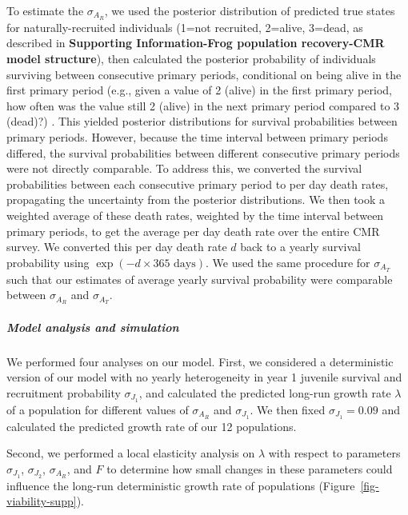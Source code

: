\documentclass[9pt,twoside,lineno]{pnas-new}
\begin{document}
To estimate the \(\sigma_{A_R}\), we used the posterior distribution of
predicted true states for naturally-recruited individuals (1=not
recruited, 2=alive, 3=dead, as described in \textbf{Supporting
Information-Frog population recovery-CMR model structure}), then
calculated the posterior probability of individuals surviving between
consecutive primary periods, conditional on being alive in the first
primary period (e.g., given a value of 2 (alive) in the first primary
period, how often was the value still 2 (alive) in the next primary
period compared to 3 (dead)?) . This yielded posterior distributions for
survival probabilities between primary periods. However, because the
time interval between primary periods differed, the survival
probabilities between different consecutive primary periods were not
directly comparable. To address this, we converted the survival
probabilities between each consecutive primary period to per day death
rates, propagating the uncertainty from the posterior distributions. We
then took a weighted average of these death rates, weighted by the time
interval between primary periods, to get the average per day death rate
over the entire CMR survey. We converted this per day death rate \(d\)
back to a yearly survival probability using
\(\exp(-d \times 365 \text{ days})\). We used the same procedure for
\(\sigma_{A_T}\) such that our estimates of average yearly survival
probability were comparable between \(\sigma_{A_R}\) and
\(\sigma_{A_T}\).

\hypertarget{model-analysis-and-simulation}{%
\subparagraph{Model analysis and
simulation}\label{model-analysis-and-simulation}}

We performed four analyses on our model. First, we considered a
deterministic version of our model with no yearly heterogeneity in year
1 juvenile survival and recruitment probability \(\sigma_{J_1}\), and
calculated the predicted long-run growth rate \(\lambda\) of a
population for different values of \(\sigma_{A_R}\) and
\(\sigma_{J_1}\). We then fixed \(\sigma_{J_1} = 0.09\) and calculated
the predicted growth rate of our 12 populations.

Second, we performed a local elasticity analysis on \(\lambda\) with
respect to parameters \(\sigma_{J_1}\), \(\sigma_{J_2}\),
\(\sigma_{A_R}\), and \(F\) to determine how small changes in these
parameters could influence the long-run deterministic growth rate of
populations (Figure~\ref{fig-viability-supp}).
\end{document}
